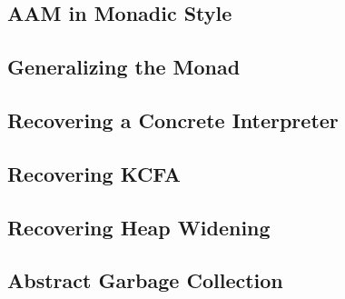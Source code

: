\subsection{AAM in Monadic Style}

\subsection{Generalizing the Monad}

\subsection{Recovering a Concrete Interpreter}

\subsection{Recovering KCFA}

\subsection{Recovering Heap Widening}

\subsection{Abstract Garbage Collection}
